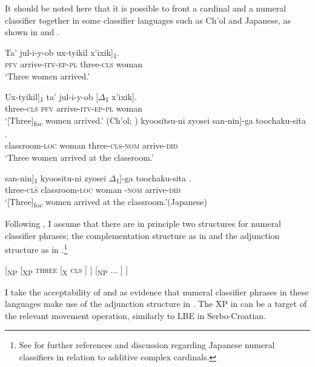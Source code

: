 \documentclass[output=paper]{langscibook}
\begin{document}
It should be noted here that it is possible to front a cardinal and a numeral classifier together in some classifier languages such as Ch'ol and Japanese, as shown in  and . 

\ea
\ea
\gll Ta' jul-i-y-ob \minsp{[} {ux-tyikil} x'ixik]\textsubscript{$1$}.\\  
     \textsc{pfv} arrive-\textsc{itv-ep-pl} {} three-\textsc{cls} woman\\ 
\glt `Three women arrived.'

\ex\label{tat:ex:chol}
\gll \minsp{[} {Ux-tyikil}]\textsubscript{$1$} ta' jul-i-y-ob [$\Delta$\textsubscript{$1$} x'ixik].\\  
     {} three-\textsc{cls} \textsc{pfv} arrive-\textsc{itv-ep-pl} {} woman\\ 
\glt `[Three]\textsubscript{foc} women arrived.' \hfill(Ch'ol; \citealt[19]{Baleetal2019})
\z\ex
\ea
\gll kyoositsu-ni \minsp{[} zyosei {san-nin}]-ga toochaku-sita .\\  
     classroom-\textsc{loc} {} woman three-\textsc{cls}-\textsc{nom} arrive-\textsc{did} \\ 
\glt `Three women arrived at the classroom.'

\ex\label{tat:ex:japa}
\gll \minsp{[} {san-nin}]\textsubscript{$1$} kyoositu-ni \minsp{[} zyosei $\Delta$\textsubscript{$1$}]-ga toochaku-sita .\\  
     {} three-\textsc{cls} classroom-\textsc{loc} {} woman {}\hspace*{5mm}-\textsc{nom} arrive-\textsc{did}\\ 
\glt `[Three]\textsubscript{foc} women arrived at the classroom.'\hfill(Japanese)
\z\z

\noindent Following \citet{HuangOchi2014}, I assume that there are in principle two structures for numeral classifier phrases; the complementation structure as in  and the adjunction structure as in .\footnote{See  for further references and discussion regarding Japanese numeral classifiers in relation to additive complex cardinals.}

\ea\label{tat:ho2}
[\textsubscript{NP} [\textsubscript{XP} \textsc{three} [\textsubscript{X} \textsc{cls} ] ] [\textsubscript{NP} ... ] ]
\z

\noindent I take the acceptability of  and  as evidence that numeral classifier phrases in these languages make use of the adjunction structure in . The XP in  can be a target of the relevant movement operation, similarly to LBE in Serbo-Croatian.
\end{document}
